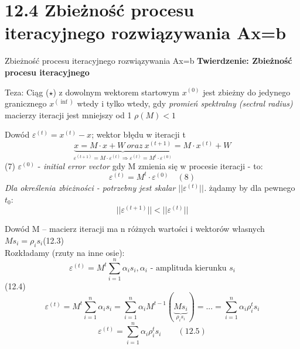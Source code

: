 \section{12.4 Zbieżność procesu iteracyjnego rozwiązywania Ax=b}

\begin{frame}{Zbieżność procesu iteracyjnego rozwiązywania Ax=b}
  \textbf{Twierdzenie: Zbieżność procesu iteracyjnego}
  \begin{block}{Teza:}
    \center Ciąg ($\star$) z dowolnym wektorem startowym $x^{(0)}$ jest zbieżny do jedynego granicznego $x^{(\inf)}$ wtedy i tylko wtedy, gdy \emph{promień spektralny (sectral radius)} macierzy iteracji jest mniejszy od 1
    \center $\rho(M)<1$
  \end{block}
\end{frame}

\begin{frame}{}
  \begin{block}{Dowód}
    $\varepsilon^{(t)}=x^{(t)}-x$; wektor błędu w iteracji t
    \[\underbrace{x=M \cdot x+W\ oraz\ x^{(t+1)}}_{\varepsilon^{(t+1)}=M \cdot \varepsilon^{(t)} \Rightarrow \varepsilon^{(t)}=M^t \cdot \varepsilon^{(0)}}=M \cdot x^{(t)}+W\]
    (7) $\varepsilon^{(0)}$ - \emph{initial error vector} gdy M zmienia się w procesie iteracji - to:
    \[{\varepsilon}^{(t)}=M^t \cdot {\varepsilon}^{(0)} \quad (8)\]
    \emph{Dla określenia zbieżności - potrzebny jest skalar $||\varepsilon^{(t)}||$.}
    żądamy by dla pewnego $t_0$:
    \[||\varepsilon^{(t+1)}||<||\varepsilon^{(t)}||\]
  \end{block}
\end{frame}

\begin{frame}{}
  \begin{block}{Dowód}
    M -- macierz iteracji ma n różnych wartości i wektorów własnych
    \\\hfill$Ms_i=\rho _is_i$\hfill (12.3)
    \\Rozkładamy (rzuty na inne osie):
    \[\varepsilon^{(t)}=M^t \sum_{i = 1}^{n} \alpha _i s_i , \alpha _i \text{ - amplituda kierunku } s_i\]
    \hfill\hfill(12.4)
    \[\varepsilon^{(t)}=M^t \sum_{i = 1}^{n} \alpha _i s_i = \sum_{i = 1}^{n} \alpha _i M^{t-1}(\underbrace{Ms_i}_{\rho _i s_i}) = ... = \sum_{i = 1}^{n} \alpha _i \rho _i^t s_i \]
    \[\boxed{\varepsilon^{(t)}=\sum_{i = 1}^{n} \alpha _i \rho _i^t s_i} \qquad (12.5)\]
  \end{block}
\end{frame}

